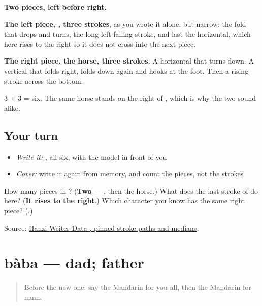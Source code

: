 \begin{quote}
\end{quote}

\textbf{Two pieces, left before right.}

\textbf{The left piece, , three strokes}, as you wrote it alone, but narrow: the fold that drops and turns, the long left-falling stroke, and last the horizontal, which here rises to the right so it does not cross into the next piece.

\textbf{The right piece, the horse, three strokes.} A horizontal that turns down. A vertical that folds right, folds down again and hooks at the foot. Then a rising stroke across the bottom.

3 + 3 = six. The same horse stands on the right of , which is why the two sound alike.

\subsection*{Your turn}
\begin{itemize}
\raggedright
  \item \emph{Write it:} , all six, with the model in front of you
  \item \emph{Cover:} write it again from memory, and count the pieces, not the strokes
\end{itemize}

\begin{tcolorbox}[breakable,colback=teal!4,colframe=teal!35!black,title={Before you move on}]
How many pieces in ? (\textbf{Two} — , then the horse.) What does the last stroke of  do here? (\textbf{It rises to the right}.) Which character you know has the same right piece? (\textbf{}.)

Source: \href{https://raw.githubusercontent.com/chanind/hanzi-writer-data/68d10a4b21150cae5e1ebbd223eed289cf32d90c/data/\%E5\%A6\%88.json}{Hanzi Writer Data , pinned stroke paths and medians}.
\end{tcolorbox}
\section[bàba]{bàba — dad; father}

\label{lesson:ZH-C32-baba}



\begin{quote}
Before the new one: say the Mandarin for you all, then the Mandarin for mum.
\end{quote}

